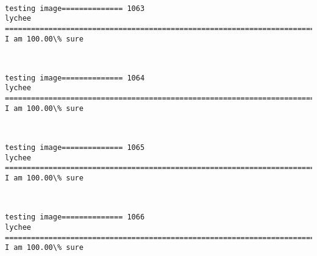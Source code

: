 \documentclass[11pt]{article}
\begin{document}
    \begin{center}
    \end{center}
    { \hspace*{\fill} \\}
    
    \begin{Verbatim}[commandchars=\\\{\}]
testing image============== 1063
lychee
============================================================================
I am 100.00\% sure

    \end{Verbatim}

    \begin{center}
    \end{center}
    { \hspace*{\fill} \\}
    
    \begin{Verbatim}[commandchars=\\\{\}]
testing image============== 1064
lychee
============================================================================
I am 100.00\% sure

    \end{Verbatim}

    \begin{center}
    \end{center}
    { \hspace*{\fill} \\}
    
    \begin{Verbatim}[commandchars=\\\{\}]
testing image============== 1065
lychee
============================================================================
I am 100.00\% sure

    \end{Verbatim}

    \begin{center}
    \end{center}
    { \hspace*{\fill} \\}
    
    \begin{Verbatim}[commandchars=\\\{\}]
testing image============== 1066
lychee
============================================================================
I am 100.00\% sure

    \end{Verbatim}
\end{document}
